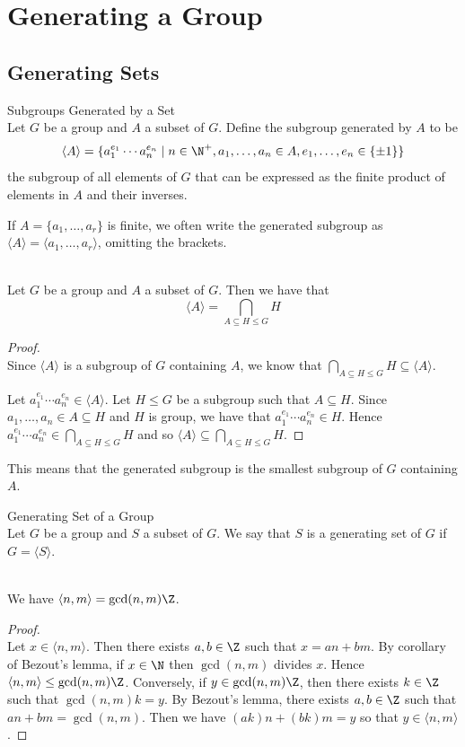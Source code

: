 \documentclass[a4paper]{article}
\begin{document}
\pagebreak
\section{Generating a Group}
\subsection{Generating Sets}
\begin{defn}{Subgroups Generated by a Set}{}\\
Let $G$ be a group and $A$ a subset of $G$. Define the subgroup generated by $A$ to be $$\langle A\rangle=\{a_1^{e_1}\cdots a_n^{e_n}\;|\;n\in\N^+, a_1,\dots,a_n\in A, e_1,\dots,e_n\in\{\pm1\}\}$$ the subgroup of all elements of $G$ that can be expressed as the finite product of elements in $A$ and their inverses. 
\end{defn}

If $A=\{a_1,\dots,a_r\}$ is finite, we often write the generated subgroup as $\langle A\rangle=\langle a_1,\dots,a_r\rangle$, omitting the brackets. \\

\begin{prp}{}{}\\
Let $G$ be a group and $A$ a subset of $G$. Then we have that $$\langle A\rangle=\bigcap_{A\subseteq H\leq G}H$$
\begin{proof}\\
Since $\langle A\rangle$ is a subgroup of $G$ containing $A$, we know that $\bigcap_{A\subseteq H\leq G}H\subseteq\langle A\rangle$. 

Let $a_1^{e_1}\cdots a_n^{e_n}\in\langle A\rangle$. Let $H\leq G$ be a subgroup such that $A\subseteq H$. Since $a_1,\dots,a_n\in A\subseteq H$ and $H$ is  group, we have that $a_1^{e_1}\cdots a_n^{e_n}\in H$. Hence $a_1^{e_1}\cdots a_n^{e_n}\in\bigcap_{A\subseteq H\leq G}H$ and so $\langle A\rangle\subseteq\bigcap_{A\subseteq H\leq G}H$. 
\end{proof}
\end{prp}

This means that the generated subgroup is the smallest subgroup of $G$ containing $A$. 

\begin{defn}{Generating Set of a Group}{}\\
Let $G$ be a group and $S$ a subset of $G$. We say that $S$ is a generating set of $G$ if $G=\langle S\rangle$. 
\end{defn}

\begin{eg}{}{}\\
We have $\langle n,m\rangle=\gcd(n,m)\Z$. 
\begin{proof}\\
Let $x\in\langle n,m\rangle$. Then there exists $a,b\in\Z$ such that $x=an+bm$. By corollary of Bezout's lemma, if $x\in\N$ then $\gcd(n,m)$ divides $x$. Hence $\langle n,m\rangle\leq\gcd(n,m)\Z$. Conversely, if $y\in\gcd(n,m)\Z$, then there exists $k\in\Z$ such that $\gcd(n,m)k=y$. By Bezout's lemma, there exists $a,b\in\Z$ such that $an+bm=\gcd(n,m)$. Then we have $(ak)n+(bk)m=y$ so that $y\in\langle n,m\rangle$. 
\end{proof}
\end{eg}
\end{document}
